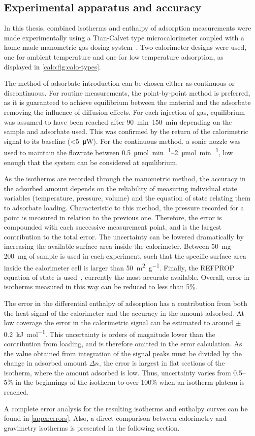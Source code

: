 \subsection{Experimental apparatus and accuracy}

In this thesis, combined isotherms and enthalpy of adsorption
measurements were made experimentally using a Tian-Calvet type
microcalorimeter coupled with a home-made manometric gas dosing
system~\cite{llewellynGasAdsorptionMicrocalorimetry2005}.
Two calorimeter designs were used, one for ambient temperature
and one for low temperature adsorption, as displayed in
\autoref{calo:fig:calo-types}. 

The method of adsorbate introduction can be chosen either as
continuous or discontinuous. For routine measurements,
the point-by-point method is preferred, as it is guaranteed
to achieve equilibrium between the material and the adsorbate
removing the influence of diffusion effects.
For each injection of gas, equilibrium was assumed to have
been reached after \SIrange{90}{150}{\minute} depending on the
sample and adsorbate used. This was confirmed by the return
of the calorimetric signal to its baseline (<\SI{5}{\micro\watt}).
For the continuous method, a sonic nozzle was used to 
maintain the flowrate between \SIrange{0.5}{2}{\micro\mol\per\minute},
low enough that the system can be considered at equilibrium.

As the isotherms are recorded through the manometric method,
the accuracy in the adsorbed amount depends on the reliability
of measuring individual state variables (temperature,
pressure, volume) and the equation of state relating them to adsorbate loading.
Characteristic to this method, the pressure recorded for 
a point is measured in relation to the previous one. Therefore,
the error is compounded with each successive measurement point,
and is the largest contribution to the total error. The 
uncertainty can be lowered dramatically by increasing 
the available surface area inside the calorimeter.
Between \SIrange{50}{200}{\milli\gram}
of sample is used in each experiment, such that the specific
surface area inside the calorimeter cell is larger than
\SI{50}{\metre^2\per\gram}. Finally, the REFPROP equation
of state is used~\cite{lemmonNISTReferenceFluid1989}, 
currently the most accurate available.
Overall, error in isotherms measured in this way can be 
reduced to less than 5\%.

The error in the differential enthalpy of adsorption has a
contribution from both the heat signal of the calorimeter 
and the accuracy in the amount adsorbed.
At low coverage the error in the calorimetric signal can be
estimated to around \( \pm \) \SI{0.2} {\kilo\joule\per\mol}.
This uncertainty is orders of magnitude lower than the contribution
from loading, and is therefore omitted in the error calculation.
As the value obtained from integration of the signal peaks
must be divided by the change in adsorbed amount \(\Delta n\),
the error is largest in flat sections of the isotherm, where 
the amount adsorbed is low. Thus, uncertainty varies from 
0.5--5\% in the beginnings of the isotherm to over 100\% when
an isotherm plateau is reached.

A complete error analysis for the resulting isotherms and enthalpy
curves can be found in \autoref{appx:errors}. Also, a direct comparison
between calorimetry and gravimetry isotherms is presented in the 
following section.
